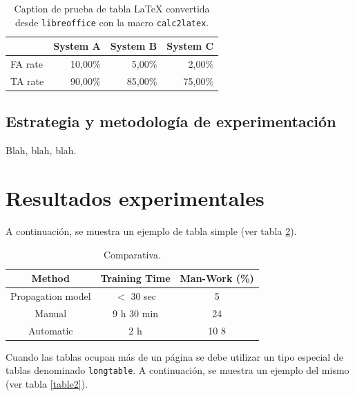 \documentclass[spanish,openright]{book}
\begin{document}
\begin{table}[htbp]
\caption{Caption de prueba de tabla LaTeX convertida desde
\texttt{libreoffice} con la macro \texttt{calc2latex}.}
\begin{center}
\begin{tabular}{|l|r|r|r|}
\hline
& \multicolumn{1}{l|}{System A} & \multicolumn{1}{l|}{System B} & \multicolumn{1}{l|}{System C} \\ \hline
FA rate & 10,00\% & 5,00\% & 2,00\% \\ \hline
TA rate & 90,00\% & 85,00\% & 75,00\% \\ \hline
\end{tabular}
\end{center}
\label{pruebaCalc2LaTeX}
\end{table}



\subsection{Estrategia y metodología de experimentación}
\label{sec:estr-y-metod}

Blah, blah, blah.


\section{Resultados experimentales}
\label{sec:result-experim}

A continuación, se muestra un ejemplo de tabla simple (ver tabla \ref{tab:table1}).

\begin{table}
\renewcommand{\arraystretch}{1.3}
\caption{Comparativa.}
\label{tab:table1}
\begin{center}
\begin{tabular}{|c|c|c|}
\hline
Method & Training Time & Man-Work (\%)\\
\hline
Propagation model & $<$ 30 sec & 5\\
\hline
Manual & 9 h 30 min & 24\\
\hline
Automatic & 2 h & 10 8\\
\hline
\end{tabular}
\end{center}
\end{table}

Cuando las tablas ocupan más de un página se debe utilizar un tipo
especial de tablas denominado \texttt{longtable}. A continuación, se
muestra un ejemplo del mismo (ver tabla \ref{table2}).
\end{document}
